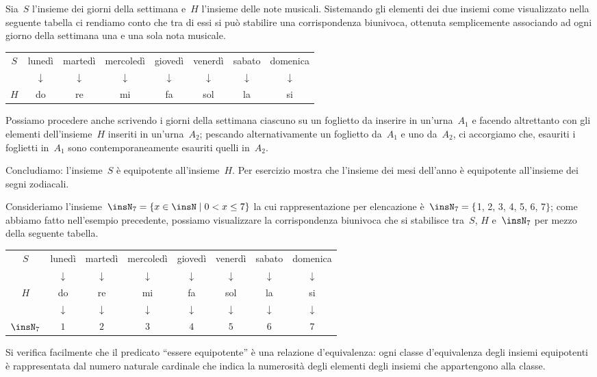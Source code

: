 \begin{exrig}
 \begin{esempio}
Sia~$S$ l'insieme dei giorni della settimana e~$H$ l'insieme delle note musicali.
Sistemando gli elementi dei due insiemi come visualizzato nella seguente tabella ci rendiamo conto che tra di essi si può stabilire
una corrispondenza biunivoca, ottenuta semplicemente associando ad ogni giorno della settimana una e una sola nota musicale.
\begin{center}
 \begin{tabular}{cccccccc}
  \toprule
  $S$ & lunedì & martedì & mercoledì & giovedì & venerdì & sabato & domenica\\
    & $\downarrow$ & $\downarrow$ & $\downarrow$ & $\downarrow$ & $\downarrow$ & $\downarrow$ & $\downarrow$\\
  $H$ & do & re & mi & fa & sol & la & si\\
  \bottomrule
 \end{tabular}
\end{center}
Possiamo procedere anche scrivendo i giorni della settimana ciascuno su un foglietto da inserire in un'urna~$A_{1}$ e
facendo altrettanto con gli elementi dell'insieme~$H$ inseriti in un'urna~$A_{2}$; pescando alternativamente
un foglietto da~$A_{1}$ e uno da~$A_{2}$, ci accorgiamo che, esauriti i foglietti in~$A_{1}$ sono contemporaneamente
esauriti quelli in~$A_{2}$.

Concludiamo: l'insieme~$S$ è equipotente all'insieme~$H$.
Per esercizio mostra che l'insieme dei mesi dell'anno è equipotente all'insieme dei segni zodiacali.
 \end{esempio}
 
 \begin{esempio}
Consideriamo l'insieme~$\insN_{7}=\{x\in \insN\mid  0<x\le 7\}$ la cui rappresentazione per elencazione
è~$\insN_{7}=\{$1, 2, 3, 4, 5, 6, 7$\}$; come abbiamo fatto nell'esempio precedente, possiamo visualizzare la corrispondenza biunivoca
che si stabilisce tra~$S$, $H$ e~$\insN_{7}$ per mezzo della seguente tabella.
\begin{center}
 \begin{tabular}{cccccccc}
  \toprule
  $S$ & lunedì & martedì & mercoledì & giovedì & venerdì & sabato & domenica\\
    & $\downarrow$ & $\downarrow$ & $\downarrow$ & $\downarrow$ & $\downarrow$ & $\downarrow$ & $\downarrow$\\
  $H$ & do & re & mi & fa & sol & la & si\\
    & $\downarrow$ & $\downarrow$ & $\downarrow$ & $\downarrow$ & $\downarrow$ & $\downarrow$ & $\downarrow$\\
  $\insN_7$ & $1$ & $2$ & $3$ & $4$ & $5$ & $6$ & $7$\\
  \bottomrule
 \end{tabular}
\end{center}
Si verifica facilmente che il predicato ``essere equipotente'' è una relazione d'equivalenza: ogni classe d'equivalenza degli insiemi
equipotenti è rappresentata dal numero naturale cardinale che indica la numerosità degli elementi degli insiemi che appartengono alla classe.
 \end{esempio}
\end{exrig}

